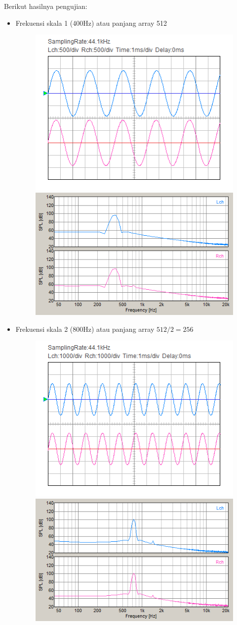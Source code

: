 \documentclass[12pt,]{article}
\begin{document}
\begin{itemize}
		Berikut hasilnya pengujian:
		\begin{itemize}
			\item Frekuensi skala 1 (400Hz) atau panjang array 512
			\begin{figure}[H]
				\centering
				\includegraphics[width=0.45\linewidth]{result/day_4/osi_sine1}
				\includegraphics[width=0.45\linewidth]{result/day_4/fft_sine1}
			\end{figure}
		
			\item Frekuensi skala 2 (800Hz) atau panjang array $512/2=256$
			\begin{figure}[H]
				\centering
				\includegraphics[width=0.45\linewidth]{result/day_4/osi_sine2}
				\includegraphics[width=0.45\linewidth]{result/day_4/fft_sine2}
			\end{figure}
		

\end{itemize}
\end{itemize}
\end{document}
